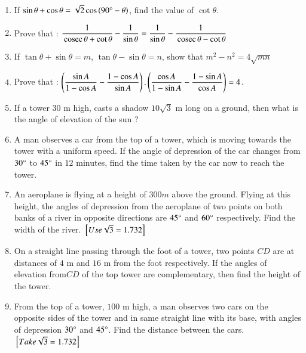 \begin{enumerate}
\hfill{}
\item If $\sin\theta+\cos\theta=\sqrt{2}\cos\left(90\degree{}-\theta\right)$, find the value of $\cot\theta$.
\hfill{}\item Prove that : $\dfrac{1}{\,\text{cosec}\,\theta+\cot\theta}-\dfrac{1}{\sin\theta}=\dfrac{1}{\sin\theta}-\dfrac{1}{\,\text{cosec}\,\theta-\cot\theta}$
\hfill{}\item If $\tan\theta+\sin\theta=m$, $\tan\theta-\sin\theta=n$, show that $m^{2}-n^{2}=4\sqrt{mn}$
\hfill{}\item Prove that : $\left(\dfrac{\sin A}{1-\cos A}-\dfrac{1-\cos A}{\sin A}\right).\left(\dfrac{\cos A}{1-\sin A}-\dfrac{1-\sin A}{\cos A}\right)=4$.
\hfill{}
\item If a tower $30$ m high, casts a shadow $10\sqrt{3}$ m long on a ground, then what is the angle of elevation of the sun ?
\hfill{}\item A man observes a car from the top of a tower, which is  moving towards the tower with a uniform speed. If the angle of depression of the car changes from $30\degree$ to $45\degree$ in $12$ minutes, find the time taken by the car now to reach the tower.
\hfill{}\item An aeroplane is flying at a height of $300 m$ above the ground. Flying at this height, the angles of depression from the aeroplane of two points on both banks of a river in opposite directions are $45\degree$ and $60\degree$ respectively. Find the width of the river. 
\hfill ${}\left[Use \sqrt 3 = 1.732\right]$
\hfill{}\item On a straight line passing through the foot of a tower, two points $C$$D$ are at distances of $4$ m
and $16$ m from the foot respectively. If the angles of elevation from$C$$D$ of the top tower are complementary, then find the height of the tower.  
\hfill{}\item From the top of a tower, $100$ m high, a man observes two cars on the opposite sides of the tower and in same straight line with its base, with angles of depression $30\degree$ and $45\degree$. Find the distance between the cars.
\hfill  ${}\left[Take \sqrt{3} = 1.732\right]$
\hfill{}


\end{enumerate}
